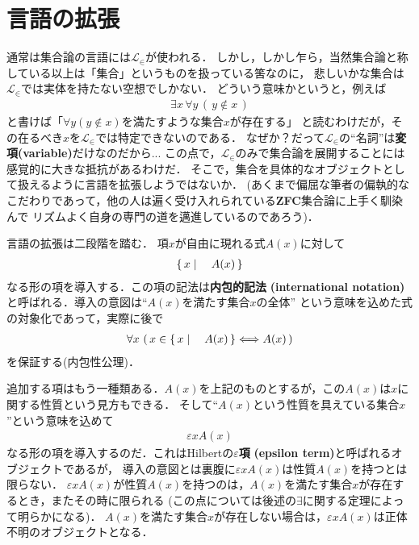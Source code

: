 \chapter{言語の拡張}
	通常は集合論の言語には$\mathcal{L}_{\in}$が使われる．
	しかし，しかし乍ら，当然集合論と称している以上は「集合」というものを扱っている筈なのに，
	悲しいかな集合は$\mathcal{L}_{\in}$では実体を持たない空想でしかない．
	どういう意味かというと，例えば
	\begin{align}	
		\exists x\, \forall y\, (\, y \notin x\, )
	\end{align}
	と書けば「$\forall y (y \notin x)$を満たすような集合$x$が存在する」
	と読むわけだが，その在るべき$x$を$\mathcal{L}_{\in}$では特定できないのである．
	なぜか？だって$\mathcal{L}_{\in}$の``名詞''は{\bf 変項}{\bf (variable)}だけなのだから...
	この点で，$\mathcal{L}_{\in}$のみで集合論を展開することには感覚的に大きな抵抗があるわけだ．
	そこで，集合を具体的なオブジェクトとして扱えるように言語を拡張しようではないか．
	(あくまで偏屈な筆者の偏執的なこだわりであって，他の人は遍く受け入れられている{\bf ZFC}集合論に上手く馴染んで
	リズムよく自身の専門の道を邁進しているのであろう)．
	
	言語の拡張は二段階を踏む．
	項$x$が自由に現れる式$A(x)$に対して
	\begin{align}
		\left\{\, x \mid \quad A(x)\, \right\}
	\end{align}
	なる形の項を導入する．この項の記法は{\bf 内包的記法}
	{\bf (international notation)}と呼ばれる．導入の意図は``$A(x)$を満たす集合$x$の全体''
	という意味を込めた式の対象化であって，実際に後で
	\begin{align}
		\forall x\, \left(\, x \in \left\{\, x \mid \quad A(x)\, \right\} \Longleftrightarrow A(x)\, \right)
	\end{align}
	を保証する(内包性公理)．
	
	追加する項はもう一種類ある．$A(x)$を上記のものとするが，この$A(x)$は$x$に関する性質という見方もできる．
	そして``$A(x)$という性質を具えている集合$x$''という意味を込めて
	\begin{align}
		\varepsilon x A(x)
	\end{align}
	なる形の項を導入するのだ．これはHilbertの{\bf $\varepsilon$項}
	{\bf (epsilon term)}と呼ばれるオブジェクトであるが，
	導入の意図とは裏腹に$\varepsilon x A(x)$は性質$A(x)$を持つとは限らない．
	$\varepsilon x A(x)$が性質$A(x)$を持つのは，$A(x)$を満たす集合$x$が存在するとき，またその時に限られる
	(この点については後述の$\exists$に関する定理によって明らかになる)．
	$A(x)$を満たす集合$x$が存在しない場合は，$\varepsilon x A(x)$は正体不明のオブジェクトとなる．
	
